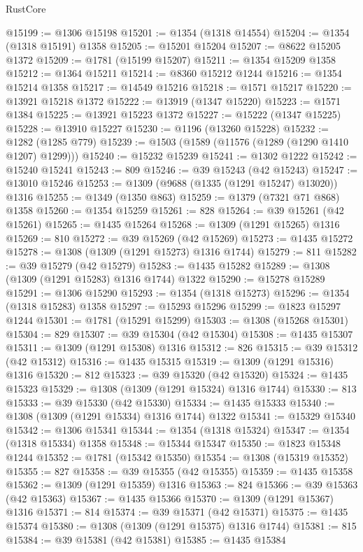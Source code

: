 \begin{lexlean}{RustCore}
\begin{coremodule}
@15199 := @1306 @15198
@15201 := @1354 (@1318 @14554)
@15204 := @1354 (@1318 @15191) @1358
@15205 := @15201 @15204
@15207 := @8622 @15205 @1372
@15209 := @1781 (@15199 @15207)
@15211 := @1354 @15209 @1358
@15212 := @1364 @15211
@15214 := @8360 @15212 @1244
@15216 := @1354 @15214 @1358
@15217 := @14549 @15216
@15218 := @1571 @15217
@15220 := @13921 @15218 @1372
@15222 := @13919 (@1347 @15220)
@15223 := @1571 @1384
@15225 := @13921 @15223 @1372
@15227 := @15222 (@1347 @15225)
@15228 := @13910 @15227
@15230 := @1196 (@13260 @15228)
@15232 := @1282 (@1285 @779)
@15239 := @1503 (@1589 (@11576 (@1289 (@1290 @1410 @1207) @1299)))
@15240 := @15232 @15239
@15241 := @1302 @1222
@15242 := @15240 @15241
@15243 := 809
@15246 := @39 @15243 (@42 @15243)
@15247 := @13010 @15246
@15253 := @1309 (@9688 (@1335 (@1291 @15247) @13020)) @1316
@15255 := @1349 (@1350 @863)
@15259 := @1379 (@7321 @71 @868) @1358
@15260 := @1354 @15259
@15261 := 828
@15264 := @39 @15261 (@42 @15261)
@15265 := @1435 @15264
@15268 := @1309 (@1291 @15265) @1316
@15269 := 810
@15272 := @39 @15269 (@42 @15269)
@15273 := @1435 @15272
@15278 := @1308 (@1309 (@1291 @15273) @1316 @1744)
@15279 := 811
@15282 := @39 @15279 (@42 @15279)
@15283 := @1435 @15282
@15289 := @1308 (@1309 (@1291 @15283) @1316 @1744) @1322
@15290 := @15278 @15289
@15291 := @1306 @15290
@15293 := @1354 (@1318 @15273)
@15296 := @1354 (@1318 @15283) @1358
@15297 := @15293 @15296
@15299 := @1823 @15297 @1244
@15301 := @1781 (@15291 @15299)
@15303 := @1308 (@15268 @15301)
@15304 := 829
@15307 := @39 @15304 (@42 @15304)
@15308 := @1435 @15307
@15311 := @1309 (@1291 @15308) @1316
@15312 := 826
@15315 := @39 @15312 (@42 @15312)
@15316 := @1435 @15315
@15319 := @1309 (@1291 @15316) @1316
@15320 := 812
@15323 := @39 @15320 (@42 @15320)
@15324 := @1435 @15323
@15329 := @1308 (@1309 (@1291 @15324) @1316 @1744)
@15330 := 813
@15333 := @39 @15330 (@42 @15330)
@15334 := @1435 @15333
@15340 := @1308 (@1309 (@1291 @15334) @1316 @1744) @1322
@15341 := @15329 @15340
@15342 := @1306 @15341
@15344 := @1354 (@1318 @15324)
@15347 := @1354 (@1318 @15334) @1358
@15348 := @15344 @15347
@15350 := @1823 @15348 @1244
@15352 := @1781 (@15342 @15350)
@15354 := @1308 (@15319 @15352)
@15355 := 827
@15358 := @39 @15355 (@42 @15355)
@15359 := @1435 @15358
@15362 := @1309 (@1291 @15359) @1316
@15363 := 824
@15366 := @39 @15363 (@42 @15363)
@15367 := @1435 @15366
@15370 := @1309 (@1291 @15367) @1316
@15371 := 814
@15374 := @39 @15371 (@42 @15371)
@15375 := @1435 @15374
@15380 := @1308 (@1309 (@1291 @15375) @1316 @1744)
@15381 := 815
@15384 := @39 @15381 (@42 @15381)
@15385 := @1435 @15384

\end{coremodule}
\end{lexlean}
